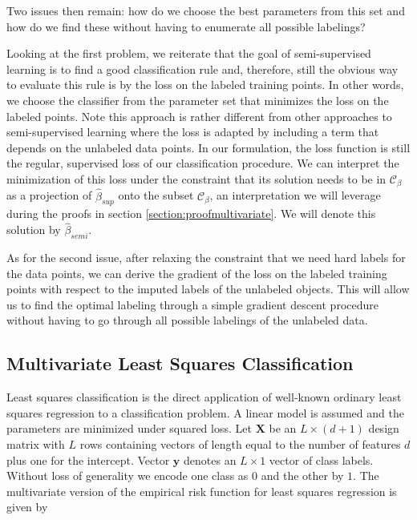 \documentclass{llncs}
\newcommand{\featdim}{d}
\newcommand{\Nlab}{L}
\begin{document}
Two issues then remain: how do we choose the best parameters from this set and how do we find these without having to enumerate all possible labelings?

Looking at the first problem, we reiterate that the goal of semi-supervised learning is to find a good classification rule and, therefore, still the obvious way to evaluate this rule is by the loss on the labeled training points. In other words, we choose the classifier from the parameter set that minimizes the loss on the labeled points. Note this approach is rather different from other approaches to semi-supervised learning where the loss is adapted by including a term that depends on the unlabeled data points. In our formulation, the loss function is still the regular, supervised loss of our classification procedure. We can interpret the minimization of this loss under the constraint that its solution needs to be in $\mathcal{C}_{\beta}$ as a projection of $\hat{\beta}_{sup}$ onto the subset $\mathcal{C}_{\beta}$, an interpretation we will leverage during the proofs in section \ref{section:proofmultivariate}. We will denote this solution by $\hat{\beta}_{semi}$.

As for the second issue, after relaxing the constraint that we need hard labels for the data points, we can derive the gradient of the loss on the labeled training points with respect to the imputed labels of the unlabeled objects.
This will allow us to find the optimal labeling through a simple gradient descent procedure without having to go through all possible labelings of the unlabeled data. 

\subsection{Multivariate Least Squares Classification} \label{section:leastsquares}

Least squares classification \cite{Hastie2001,Rifkin2003} is the direct application of well-known ordinary least squares regression to a classification problem. A linear model is assumed and the parameters are minimized under squared loss. Let $\mathbf{X}$ be an $\Nlab \times (\featdim+1)$ design matrix with $\Nlab$ rows containing vectors of length equal to the number of features $\featdim$ plus one for the intercept. Vector $\textbf{y}$ denotes an $\Nlab \times 1$ vector of  class labels. Without loss of generality we encode one class as $0$ and the other by $1$.  The multivariate version of the empirical risk function for least squares regression is given by
\end{document}
